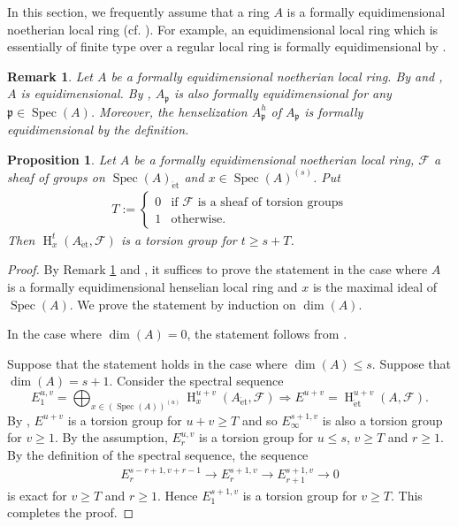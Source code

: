 \documentclass{article}
\newtheorem{prop}[thm]{\indent \sc Proposition}
\newtheorem{rem}[thm]{\indent \sc Remark}
\newcommand{\spec}{\operatorname{Spec}}
\newcommand{\et}{\mathrm{\acute{e}t}}
\newcommand{\HO}{\operatorname{H}}
\begin{document}
In this section, we frequently assume that a ring $A$ is a formally
equidimensional noetherian local ring (cf. \cite[p.251, Definition]{Ma}).
For example, an equidimensional local ring which is essentially of finite
type over a regular local ring is formally equidimensional by \cite[p.251, Theorem 31.6 (iii)]{Ma}.

%
\begin{rem}\upshape\label{Rfe}
Let $A$ be a formally equidimensional noetherian local ring. 
By \cite[p.251, Theorem 31.6 (iv)]{Ma} and
\cite[p.250, Theorem 31.5]{Ma}, $A$ is equidimensional.
By \cite[p.251, Theorem 31.6 (i)]{Ma},
$A_{\mathfrak{p}}$
is also formally equidimensional for any $\mathfrak{p}\in \spec(A)$.
Moreover, the henselization
$A_{\mathfrak{p}}^{h}$
of $A_{\mathfrak{p}}$ is  formally equidimensional by the definition.
\end{rem}
%

%
\begin{prop}\upshape\label{cst}
Let $A$ be a formally equidimensional noetherian local ring,
$\mathcal{F}$ a sheaf of groups on $\spec(A)_{\et}$
and $x\in \spec(A)^{(s)}$. Put 
%
\begin{align*}
T:=
\left\{
%
\begin{array}{ll}
0  &  \textrm{if $\mathcal{F}$ is a sheaf of torsion groups}  \\ [5pt]
1   &  \textrm{otherwise}.
\end{array}
%
\right.
\end{align*}
%
Then
$\HO^{t}_{x}(A_{\et}, \mathcal{F})$
is a torsion group
for $t\geq s+T$.
\end{prop}
%

%
\begin{proof}\upshape
By Remark \ref{Rfe} and \cite[p.93. III, Corollary 1.28]{M},  
it suffices to prove the statement in the case where $A$
is a formally equidimensional henselian local ring and
$x$ is the maximal ideal of $\spec(A)$. 
We prove the statement
by induction on $\operatorname{dim}(A)$.

In the case where $\operatorname{dim}(A)=0$,
the statement follows from \cite[p.180, Theorem 6.5.8]{We}.

Suppose that the statement holds in the case where
$\operatorname{dim}(A)\leq s$.
Suppose that $\operatorname{dim}(A)=s+1$.
Consider the spectral sequence
%
\begin{equation}\label{spt}
E^{u, v}_{1}
=
\bigoplus_{x\in (\spec(A))^{(u)}}
\HO_{x}^{u+v}
(A_{\et},
\mathcal{F})
\Rightarrow
E^{u+v}=
\HO_{\et}^{u+v}(A,
\mathcal{F}
).
\end{equation}
%
By \cite[p.180, Theorem 6.5.8]{We},
%
$E^{u+v}$
%
is a torsion group for $u+v\geq T$ and so 
%
$E^{s+1, v}_{\infty}$ is also a torsion group for $v\geq 1$.
By the assumption,
$E^{u, v}_{r}$ is a torsion group for $u\leq s$,
$v\geq T$
and $r\geq 1$. By the definition of the spectral sequence, the sequence
%
\begin{align}\label{sqrt}
E_{r}^{s-r+1, v+r-1}
\to
E^{s+1, v}_{r}
\to
E^{s+1, v}_{r+1}
\to 0
\end{align}
%
is exact for $v\geq T$ and $r\geq 1$.
Hence $E^{s+1, v}_{1}$ is a torsion group for $v\geq T$.
This completes the proof.
\end{proof}
%
\end{document}
